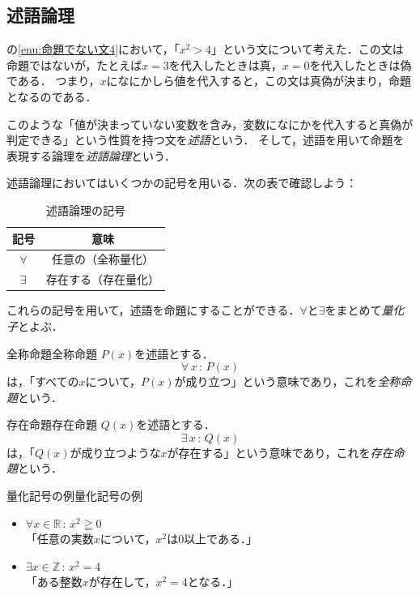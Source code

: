 \subsection{述語論理}

の\ref{enu:命題でない文4}において，「$x^2 >4$」という文について考えた．この文は命題ではないが，たとえば$x=3$を代入したときは真，$x=0$を代入したときは偽である．
つまり，$x$になにかしら値を代入すると，この文は真偽が決まり，命題となるのである．

このような「値が決まっていない変数を含み，変数になにかを代入すると真偽が判定できる」という性質を持つ文を\emph{述語}という．
そして，述語を用いて命題を表現する論理を\emph{述語論理}という．


述語論理においてはいくつかの記号を用いる．次の表で確認しよう：

\begin{table}[ht]
  \centering
  \caption{述語論理の記号}
  \begin{tabular}{c|c}
    \hline
    記号        & 意味                              \\
    \hline
    $\forall$ & 任意の（全称量化\index{ぜんしょうりょうか@全称量化}） \\
    $\exists$ & 存在する（存在量化\index{そんざいりょうか@存在量化}） \\
    \hline
  \end{tabular}
\end{table}

これらの記号を用いて，述語を命題にすることができる．$\forall$と$\exists$をまとめて\emph{量化子}とよぶ．

\begin{definition}{全称命題}{全称命題}
  $P(x)$を述語とする．
  \[
    \forall\, x \, : \, P(x)
  \]
  は，「すべての$x$について，$P(x)$が成り立つ」という意味であり，これを\emph{全称命題}という．
\end{definition}

\begin{definition}{存在命題}{存在命題}
  $Q(x)$を述語とする．
  \[
    \exists \,  x\, : \, Q(x)
  \]
  は，「$Q(x)$が成り立つような$x$が存在する」という意味であり，これを\emph{存在命題}という．
\end{definition}

\begin{example}{量化記号の例}{量化記号の例}
  \begin{itemize}
    \item $\forall x \in \mathbb{R}\, : \, x^2 \geqq 0$\\
          「任意の実数$x$について，$x^2$は$0$以上である．」
    \item $\exists x \in \mathbb{Z} \, : \, x^2 = 4$\\
          「ある整数$x$が存在して，$x^2 = 4$となる．」
  \end{itemize}
\end{example}


